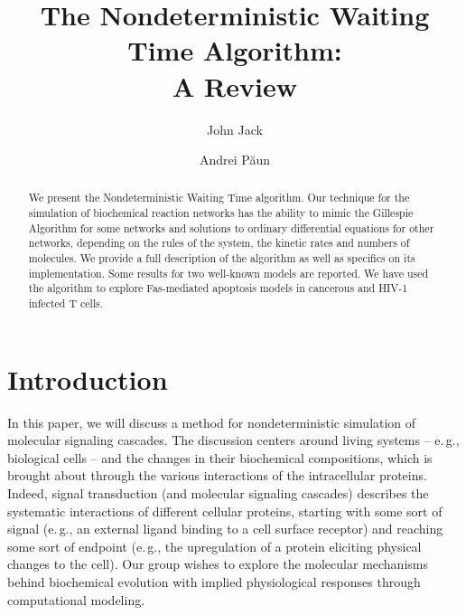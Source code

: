 \documentclass[copyright]{eptcs}
\begin{document}
\title{The Nondeterministic Waiting Time Algorithm:\\ A Review}
\def\titlerunning{The Nondeterministic Waiting Time Algorithm: A Review}

\author{John Jack
\and
Andrei P\u aun
}
\def\authorrunning{J.~Jack, A.~P\u aun}
\maketitle
\begin{abstract}
    We present the Nondeterministic Waiting Time algorithm.  Our technique for the simulation of biochemical reaction networks has the ability to mimic the Gillespie Algorithm for some networks and solutions to ordinary differential equations for other networks, depending on the rules of the system, the kinetic rates and numbers of molecules.  We provide a full description of the algorithm as well as specifics on its implementation.  Some results for two well-known models are reported.  We have used the algorithm to explore Fas-mediated apoptosis models in cancerous and HIV-1 infected T cells.
\end{abstract}


\section{Introduction}\label{intro}

In this paper, we will discuss a method for nondeterministic simulation of molecular signaling cascades.  The discussion centers around living systems -- e.\,g., biological cells -- and the changes in their biochemical compositions, which is brought about through the various interactions of the intracellular proteins.  Indeed, signal transduction (and molecular signaling cascades) describes the systematic interactions of different cellular proteins, starting with some sort of signal (e.\,g., an external ligand binding to a cell surface receptor) and reaching some sort of endpoint (e.\,g., the upregulation of a protein eliciting physical changes to the cell).  Our group wishes to explore the molecular mechanisms behind biochemical evolution with implied physiological responses through computational modeling.
\end{document}
